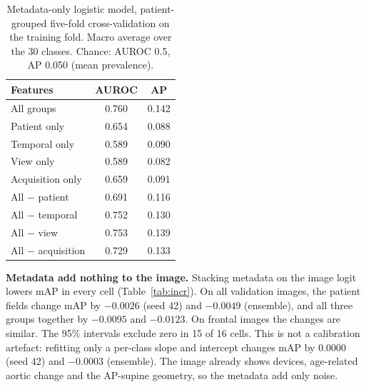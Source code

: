 \documentclass[conference]{IEEEtran}
\begin{document}
\begin{table}[htbp]
\caption{Metadata-only logistic model, patient-grouped five-fold cross-validation on the training fold. Macro average over the 30 classes. Chance: AUROC 0.5, AP 0.050 (mean prevalence).}
\begin{center}
\begin{tabular}{|l|c|c|}
\hline
\textbf{Features} & \textbf{AUROC} & \textbf{AP} \\
\hline
All groups & 0.760 & 0.142 \\
\hline
Patient only & 0.654 & 0.088 \\
\hline
Temporal only & 0.589 & 0.090 \\
\hline
View only & 0.589 & 0.082 \\
\hline
Acquisition only & 0.659 & 0.091 \\
\hline
All $-$ patient & 0.691 & 0.116 \\
\hline
All $-$ temporal & 0.752 & 0.130 \\
\hline
All $-$ view & 0.753 & 0.139 \\
\hline
All $-$ acquisition & 0.729 & 0.133 \\
\hline
\end{tabular}
\label{tab:metaonly}
\end{center}
\end{table}

\textbf{Metadata add nothing to the image.} Stacking metadata on the image logit lowers mAP in every cell (Table~\ref{tab:incr}). On all validation images, the patient fields change mAP by $-0.0026$ (seed 42) and $-0.0049$ (ensemble), and all three groups together by $-0.0095$ and $-0.0123$. On frontal images the changes are similar. The 95\% intervals exclude zero in 15 of 16 cells. This is not a calibration artefact: refitting only a per-class slope and intercept changes mAP by $0.0000$ (seed 42) and $-0.0003$ (ensemble). The image already shows devices, age-related aortic change and the AP-supine geometry, so the metadata add only noise.
\end{document}
